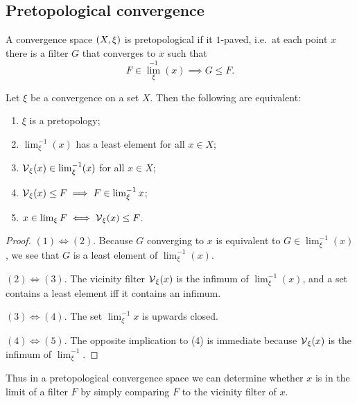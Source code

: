 \subsection{Pretopological convergence}
A convergence space $\left( X,\xi \right)$ is pretopological if it $1$-paved, i.e.\ at each point $x$ there is a filter $G$ that converges to $x$ such that
\[ F\in {\lim}_\xi^{-1}(x) \implies G \leq F. \]

\begin{lemma}
Let $\xi$ be a convergence on a set $X$. Then the following are equivalent:
\begin{enumerate}
\item $\xi$ is a pretopology;
\item $\lim_\xi^{-1}(x)$ has a least element for all $x\in X$;
\item $\operatorname{\mathcal{V}}_\xi(x) \in \lim_\xi^{-1}(x)$ for all $x\in X$;
\item $\operatorname{\mathcal{V}}_\xi(x) \leq F \implies F\in\lim^{-1}_\xi x$;
\item $x\in\lim_\xi F \iff \operatorname{\mathcal{V}}_\xi(x) \leq F$.
\end{enumerate}
\end{lemma}
\begin{proof}
$(1) \Leftrightarrow (2)$. Because $G$ converging to $x$ is equivalent to $G\in \lim_\xi^{-1}(x)$, we see that $G$ is a least element of $\lim_\xi^{-1}(x)$.

$(2) \Leftrightarrow (3)$. The vicinity filter $\operatorname{\mathcal{V}}_\xi(x)$ is the infimum of $\lim_\xi^{-1}(x)$, and a set contains a least element iff it contains an infimum.

$(3) \Leftrightarrow (4)$. The set $\lim^{-1}_\xi x$ is upwards closed.

$(4) \Leftrightarrow (5)$. The opposite implication to (4) is immediate because $\operatorname{\mathcal{V}}_\xi(x)$ is the infimum of $\lim^{-1}_\xi$.
\end{proof}
Thus in a pretopological convergence space we can determine whether $x$ is in the limit of a filter $F$ by simply comparing $F$ to the vicinity filter of $x$.

